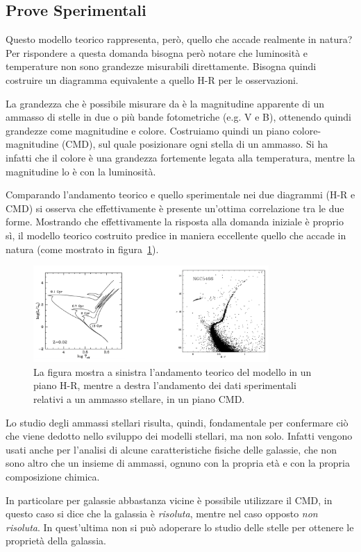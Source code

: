 \subsection{Prove Sperimentali}

Questo modello teorico rappresenta, però, quello che accade realmente in natura? Per rispondere a questa domanda bisogna però notare che luminosità e temperature non sono grandezze misurabili direttamente. Bisogna quindi costruire un diagramma equivalente a quello H-R per le osservazioni.

La grandezza che è possibile misurare da è la magnitudine apparente di un ammasso di stelle in due o più bande fotometriche (e.g. V e B), ottenendo quindi grandezze come magnitudine e colore. Costruiamo quindi un piano colore-magnitudine (CMD), sul quale posizionare ogni stella di un ammasso. Si ha infatti che il colore è una grandezza fortemente legata alla temperatura, mentre la magnitudine lo è con la luminosità.

Comparando l'andamento teorico e quello sperimentale nei due diagrammi (H-R e CMD) si osserva che effettivamente è presente un'ottima correlazione tra le due forme. Mostrando che effettivamente la risposta alla domanda iniziale è proprio sì, il modello teorico costruito predice in maniera eccellente quello che accade in natura (come mostrato in figura~\ref{fig:modello-osservazione-stellare}).
\begin{figure}
    \centering
    \includegraphics[width = 0.8\textwidth]{immagini/dati-sper-stelle.png}
    \caption{La figura mostra a sinistra l'andamento teorico del modello in un piano H-R, mentre a destra l'andamento dei dati sperimentali relativi a un ammasso stellare, in un piano CMD.}\label{fig:modello-osservazione-stellare}
\end{figure}

Lo studio degli ammassi stellari risulta, quindi, fondamentale per confermare ciò che viene dedotto nello sviluppo dei modelli stellari, ma non solo. Infatti vengono usati anche per l'analisi di alcune caratteristiche fisiche delle galassie, che non sono altro che un insieme di ammassi, ognuno con la propria età e con la propria composizione chimica.

In particolare per galassie abbastanza vicine è possibile utilizzare il CMD, in questo caso si dice che la galassia è \emph{risoluta}, mentre nel caso opposto \emph{non risoluta}. In quest'ultima non si può adoperare lo studio delle stelle per ottenere le proprietà della galassia.